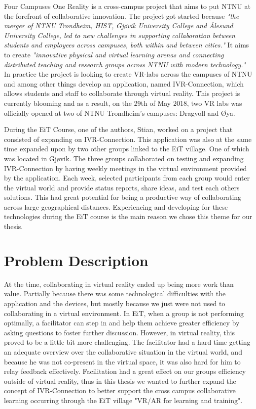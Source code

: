         Four Campuses One Reality is a cross-campus project that aims to put NTNU at the forefront of collaborative innovation. The project got started because \emph{"the merger of NTNU Trondheim, HIST, Gjøvik University College and Ålesund University College, led to new challenges in supporting collaboration between students and employees across campuses, both within and between cities."} \cite{4C1R-Pitch}  It aims to create \emph{"innovative physical and virtual learning arenas and connecting distributed teaching and research groups across NTNU with modern technology."} \cite{4C1R-Pitch} In practice the project is looking to create VR-labs across the campuses of NTNU and among other things develop an application, named IVR-Connection, which allows students and staff to collaborate through virtual reality. This project is currently blooming \cite{4C1R-Geminin} and as a result, on the 29th of May 2018, two VR labs was officially opened at two of NTNU Trondheim's campuses: Dragvoll and Øya.\cite{OpenVRLab}
        
        During the EiT Course, one of the authors, Stian, worked on a project that consisted of expanding on IVR-Connection. This application was also at the same time expanded upon by two other groups linked to the EiT village. One of which was located in Gjøvik. The three groups collaborated on testing and expanding IVR-Connection by having weekly meetings in the virtual environment provided by the application. Each week, selected participants from each group would enter the virtual world and provide status reports, share ideas, and test each others solutions. This had great potential for being a productive way of collaborating across large geographical distances. Experiencing and developing for these technologies during the EiT course is the main reason we chose this theme for our thesis.
    
    \section{Problem Description}
        At the time, collaborating in virtual reality ended up being more work than value. Partially because there was some technological difficulties with the application and the devices, but mostly because we just were not used to collaborating in a virtual environment. In EiT, when a group is not performing optimally, a facilitator can step in and help them achieve greater efficiency by asking questions to foster further discussion. However, in virtual reality, this proved to be a little bit more challenging. The facilitator had a hard time getting an adequate overview over the collaborative situation in the virtual world, and because he was not co-present in the virtual space, it was also hard for him to relay feedback effectively. Facilitation had a great effect on our groups efficiency outside of virtual reality, thus in this thesis we wanted to further expand the concept of IVR-Connection to better support the cross campus collaborative learning occurring through the EiT village "VR/AR for learning and training".
        
